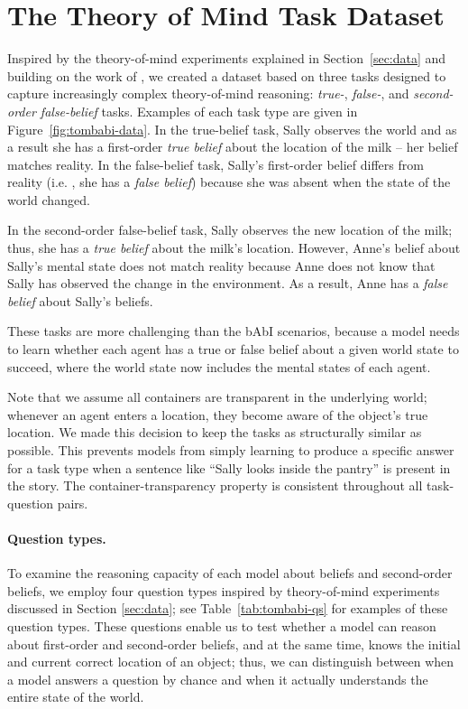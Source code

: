 \section{The Theory of Mind Task Dataset}

Inspired by the theory-of-mind experiments explained in Section~\ref{sec:data} and building on the work of \citet{grant.etal.2017}, we created a dataset based on three tasks designed to capture increasingly complex theory-of-mind reasoning:
\emph{true-}, \emph{false-}, and \emph{second-order false-belief} tasks. Examples of each task type are given in Figure~\ref{fig:tombabi-data}.  In the true-belief task, Sally observes the world and as a result she has a first-order \emph{true belief} about the location of the milk -- her belief matches reality.  In the false-belief task, Sally's first-order belief differs from reality (i.e. , she has a \emph{false belief}) because she was absent when the state of the world changed.

In the second-order false-belief task, Sally observes the new location of the milk; thus, she has a \emph{true belief} about the milk's location.  However, Anne's belief about Sally's mental state does not match reality because Anne does not know that Sally has observed the change in the environment.  As a result, Anne has a \emph{false belief} about Sally's beliefs.

These tasks are more challenging than the bAbI scenarios, because a model needs to learn whether each agent has a true or false belief about a given world state to succeed, where the world state now includes the mental states of each agent.

Note that we assume all containers are transparent in the underlying world; whenever an agent enters a location, they become aware of the object’s true location. We made this decision to keep the tasks as structurally similar as possible. This  prevents models from simply learning to produce a specific answer for a task type when a sentence like ``Sally looks inside the pantry'' is present in the story.  The container-transparency property is consistent throughout all task-question pairs.

\paragraph{Question types.} To examine the reasoning capacity of each model about beliefs and second-order beliefs, we employ four question types inspired by theory-of-mind experiments discussed in Section \ref{sec:data}; see
Table~\ref{tab:tombabi-qs} for examples of these question types. These questions enable us to test whether a model can reason about first-order and second-order beliefs, and at the same time, knows the initial and current correct location of an object; thus, we can distinguish between when a model answers a question by chance and when it actually understands the entire state of the world.

